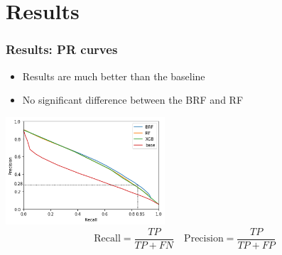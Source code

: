 \documentclass[slidestop,compress,red,mathserif]{beamer}
\newcommand{\colorcite}[1]{\colorlet{saved}{.}\color{sangria}\cite{#1}\color{saved}}
\begin{document}
\section{Results}


\begin{frame}
	\frametitle{Results: PR curves}
	\begin{itemize}
		\item Results are much better than the baseline
		\item No significant difference between the BRF and RF
	\end{itemize}
\centering
\includegraphics[height=4cm, keepaspectratio]{Figures/pr.png}
\begin{equation*}
  \mathrm{Recall} = \frac{TP}{TP+FN} \quad  \mathrm{Precision} = \frac{TP}{TP+FP}
\end{equation*}
\end{frame}
\end{document}
